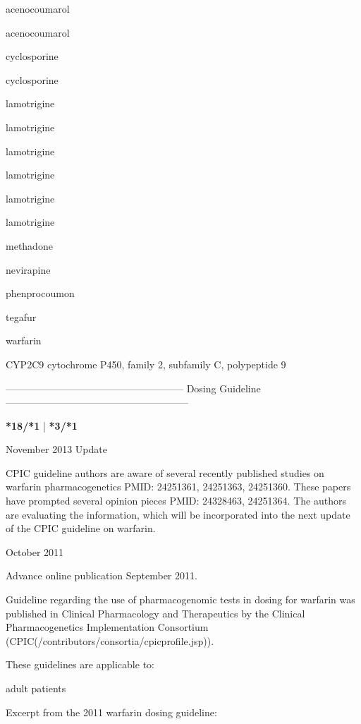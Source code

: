 \documentclass{resume} %
\begin{document}
\begin{rSection}{ acenocoumarol }
\begin{rSection}{ acenocoumarol }
\begin{rSection}{ cyclosporine }
\begin{rSection}{ cyclosporine }
\begin{rSection}{ lamotrigine }
\begin{rSection}{ lamotrigine }
\begin{rSection}{ lamotrigine }
\begin{rSection}{ lamotrigine }
\begin{rSection}{ lamotrigine }
\begin{rSection}{ lamotrigine }
\begin{rSection}{ methadone }
\begin{rSection}{ nevirapine }
\begin{rSection}{ phenprocoumon }
\begin{rSection}{ tegafur }
\end{rSection}\begin{rSection}{ warfarin }
\item[]
\begin{rSubsection}{ CYP2C9 }{ cytochrome P450, family 2, subfamily C, polypeptide 9 }{}{}
\item[]
\item[] ------------------------------------------------------ Dosing Guideline --------------------------------------------------------\newline
\item[]
\item[] \textbf{ *18/*1 } | \textbf{ *3/*1 }
\item November 2013 Update
 \newline
\item CPIC guideline authors are aware of several recently published studies on warfarin pharmacogenetics PMID: 24251361, 24251363, 24251360. These papers have prompted several opinion pieces PMID: 24328463, 24251364. The authors are evaluating the information, which will be incorporated into the next update of the CPIC guideline on warfarin.
 \newline
\item October 2011
 \newline
\item Advance online publication September 2011. 
 \newline
\item Guideline regarding the use of pharmacogenomic tests in dosing for warfarin was published in Clinical Pharmacology and Therapeutics by the Clinical Pharmacogenetics Implementation Consortium (CPIC(/contributors/consortia/cpicprofile.jsp)).  
 \newline
\item These guidelines are applicable to:
 \newline
\item adult patients
 \newline
\item Excerpt from the 2011 warfarin dosing guideline:
 \newline

\end{rSubsection}
\end{rSection}
\end{rSection}
\end{rSection}
\end{rSection}
\end{rSection}
\end{rSection}
\end{rSection}
\end{rSection}
\end{rSection}
\end{rSection}
\end{rSection}
\end{rSection}
\end{rSection}
\end{rSection}
\end{document}

